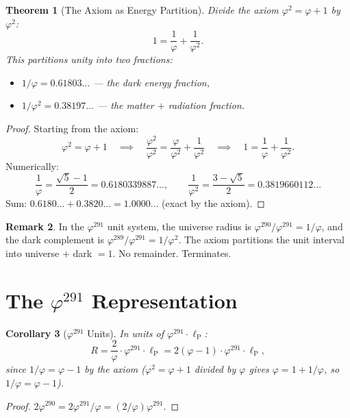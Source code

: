 \documentclass[11pt,a4paper]{article}
\theoremstyle{plain}
\newtheorem{theorem}{Theorem}[section]
\newtheorem{corollary}[theorem]{Corollary}
\theoremstyle{definition}
\newtheorem{remark}[theorem]{Remark}
\newcommand{\lP}{\ell_{\mathrm{P}}}
\newcommand{\vp}{\varphi}
\begin{document}
\begin{theorem}[The Axiom as Energy Partition]\label{thm:partition}
Divide the axiom $\vp^2 = \vp + 1$ by $\vp^2$:
\[
  1 = \frac{1}{\vp} + \frac{1}{\vp^2}.
\]
This partitions unity into two fractions:
\begin{itemize}[nosep]
  \item $1/\vp = 0.61803\ldots$ \;---\; the dark energy fraction,
  \item $1/\vp^2 = 0.38197\ldots$ \;---\; the matter $+$ radiation fraction.
\end{itemize}
\end{theorem}

\begin{proof}
Starting from the axiom:
\[
  \vp^2 = \vp + 1 \quad\implies\quad
  \frac{\vp^2}{\vp^2} = \frac{\vp}{\vp^2} + \frac{1}{\vp^2}
  \quad\implies\quad
  1 = \frac{1}{\vp} + \frac{1}{\vp^2}.
\]
Numerically:
\[
  \frac{1}{\vp} = \frac{\sqrt{5}-1}{2} = 0.6180339887\ldots, \qquad
  \frac{1}{\vp^2} = \frac{3-\sqrt{5}}{2} = 0.3819660112\ldots
\]
Sum: $0.6180\ldots + 0.3820\ldots = 1.0000\ldots$ \;(exact by the axiom).
\end{proof}

\begin{remark}
In the $\vp^{291}$ unit system, the universe radius is
$\vp^{290}/\vp^{291} = 1/\vp$, and the dark complement is
$\vp^{289}/\vp^{291} = 1/\vp^2$.  The axiom partitions the unit
interval into universe $+$ dark $= 1$.  No remainder.  Terminates.
\end{remark}

\section{The $\vp^{291}$ Representation}\label{sec:291}

\begin{corollary}[$\vp^{291}$ Units]\label{cor:291}
In units of $\vp^{291} \cdot \lP$:
\[
  R = \frac{2}{\vp} \cdot \vp^{291} \cdot \lP
  = 2(\vp - 1) \cdot \vp^{291} \cdot \lP,
\]
since $1/\vp = \vp - 1$ by the axiom ($\vp^2 = \vp + 1$ divided by
$\vp$ gives $\vp = 1 + 1/\vp$, so $1/\vp = \vp - 1$).
\end{corollary}

\begin{proof}
$2\vp^{290} = 2\vp^{291}/\vp = (2/\vp)\vp^{291}$.
\end{proof}
\end{document}
